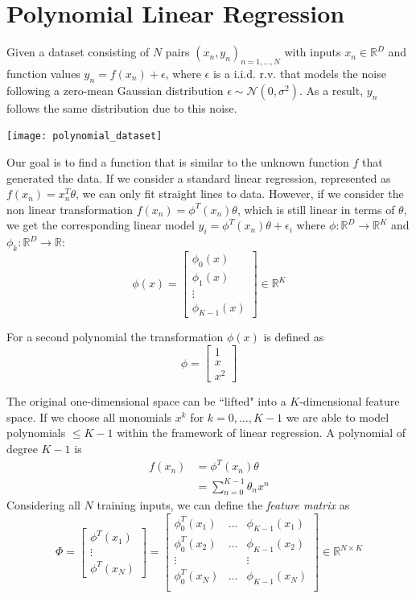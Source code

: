 \documentclass{article}
\begin{document}
\section{Polynomial Linear Regression}
Given a dataset consisting of $N$ pairs $(x_n,y_n)_{n=1,\ldots,N}$ with inputs
$x_n\in \mathbb{R}^D$ and function values $y_n=f(x_n)+\epsilon$, where
$\epsilon$ is a i.i.d. r.v. that models the noise following a zero-mean
Gaussian distribution $\epsilon\sim \mathcal{N}(0,\sigma^2)$. As a result,
$y_n$ follows the same distribution due to this noise.
\begin{center}
    \texttt{[image: polynomial\_dataset]}
\end{center}
Our goal is to find a function that is similar to the unknown function $f$
that generated the data. If we consider a standard linear regression,
represented as $f(x_n)=x_n^T\theta$, we can only fit straight lines to data.
However, if we consider the non linear transformation
$f(x_n)=\phi^T(x_n)\theta$, which is still linear in terms of $\theta$, we get
the corresponding linear model $y_i=\phi^T(x_n)\theta+\epsilon_i$ where
$\phi:\mathbb{R}^D\to \mathbb{R}^K$ and $\phi_k:\mathbb{R}^D\to \mathbb{R}$:
$$
\phi(x)=\begin{bmatrix}
    \phi_0(x) \\ 
    \phi_1(x) \\ 
    \vdots \\
    \phi_{K-1}(x)  
\end{bmatrix}
\in \mathbb{R}^K
$$
\begin{example}
    For a second polynomial the transformation $\phi(x)$ is defined as
    $$
    \phi=\begin{bmatrix}
        1 \\ 
        x \\ 
        x^2
    \end{bmatrix}
    $$    
\end{example}
The original one-dimensional space can be ``lifted" into a $K$-dimensional
feature space. If we choose all monomials $x^k$ for $k=0,\ldots,K-1$ we are
able to model polynomials $\leq K-1$ within the framework of linear
regression. A polynomial of degree $K-1$ is
$$
\begin{aligned}
    f(x_n)&=\phi^T(x_n)\theta \\
       &= \displaystyle\sum_{n=0}^{K-1}\theta_nx^n
\end{aligned}
$$
Considering all $N$ training inputs, we can define the \textit{feature matrix}
as 
$$
\Phi=\begin{bmatrix}
   \phi^T(x_1) \\ 
   \vdots \\
   \phi^T(x_N) 
\end{bmatrix} = \begin{bmatrix}
\phi_0^T(x_1) & \ldots & \phi_{K-1}(x_1) \\ 
\phi_0^T(x_2) & \ldots & \phi_{K-1}(x_2) \\
\vdots & & \vdots \\ 
\phi_0^T(x_N) & \ldots & \phi_{K-1}(x_N) \\
\end{bmatrix}
\in \mathbb{R}^{N\times K}
$$
\end{document}
